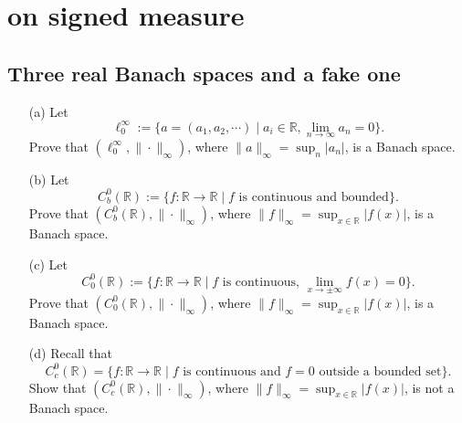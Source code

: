 \documentclass[lang=cn,11pt]{elegantbook}
\begin{document}
\chapter{on signed measure}


\section{Three real Banach spaces and a fake one}
  \begin{itemize}
  \item[(a)]  Let 
    \[
      \ell^\infty_0 := \{ a= (a_1, a_2, \cdots)\mid a_i\in \mathbb{R}, \lim_{n\to \infty} a_n =0\}.
    \]Prove that $(\ell^\infty_0, \| \cdot\|_\infty)$, where $\|a\|_\infty=\sup_n|a_n|$, is a Banach space.
  \item[(b)]   Let
    \[
      C^0_b(\mathbb{R}) := \{ f: \mathbb{R} \to \mathbb{R} \mid \text{$f$ is continuous and bounded}\}.
    \]
    Prove that $(C^0_b(\mathbb{R}), \| \cdot\|_\infty)$, where $\|f\|_\infty=\sup_{x\in \mathbb{R}}|f(x)|$, is a Banach space.
  \item[(c)]   Let
    \[
      C^0_0(\mathbb{R}) := \{ f: \mathbb{R}\to  \mathbb{R} \mid \text{$f$ is continuous, $\lim_{x\to\pm\infty} f(x) =0$}\}.
    \]
    Prove that $(C^0_0(\mathbb{R}), \| \cdot\|_\infty)$, where $\|f\|_\infty=\sup_{x\in\mathbb{R}}|f(x)|$, is a Banach space.
    \item[(d)] Recall that 
    \[
      C^0_c(\mathbb{R}) = \{ f\colon \mathbb{R} \to \mathbb{R} \mid \text{$f$ is continuous and $f=0$ outside a bounded set}\}.
    \]
    Show that $(C^0_c(\mathbb{R}), \| \cdot\|_\infty)$, where $\|f\|_\infty=\sup_{x\in \mathbb{R}}|f(x)|$, is not a Banach space.
\end{itemize}
\end{document}
